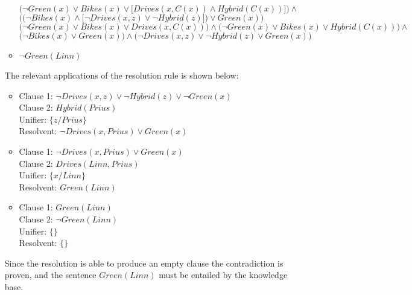 \begin{enumerate}
\begin{itemize}
$\big(\neg \textit{Green}(x) \lor \textit{Bikes}(x) \lor \big[ \textit{Drives}(x, C(x)) \land \textit{Hybrid}(C(x)) \big] \big) \land$\\
$\big(\big( \neg \textit{Bikes}(x) \land  \big[ \neg \textit{Drives}(x, z) \lor \neg \textit{Hybrid}(z) \big] \big) \lor \textit{Green}(x) \big)$\\[1ex]
$\big(\neg \textit{Green}(x) \lor \textit{Bikes}(x) \lor \textit{Drives}(x, C(x)) \big) \land \big(\neg \textit{Green}(x) \lor \textit{Bikes}(x) \lor \textit{Hybrid}(C(x)) \big) \land$\\
$\big( \neg \textit{Bikes}(x) \lor \textit{Green}(x) \big) \land \big( \neg \textit{Drives}(x, z) \lor \neg \textit{Hybrid}(z) \lor \textit{Green}(x) \big)$

\item
$\neg \textit{Green}(\textit{Linn})$

\end{itemize}

The relevant applications of the resolution rule is shown below:

\begin{itemize}
\item
Clause 1: $\neg \textit{Drives}(x, z) \lor \neg \textit{Hybrid}(z) \lor \neg \textit{Green}(x)$\\
Clause 2: $\textit{Hybrid}(\textit{Prius})$\\
Unifier: $\{z / \textit{Prius}\}$\\
Resolvent: $\neg \textit{Drives}(x, \textit{Prius}) \lor \textit{Green}(x) $

\item
Clause 1: $\neg \textit{Drives}(x, \textit{Prius}) \lor \textit{Green}(x)$\\
Clause 2: $\textit{Drives}(\textit{Linn}, \textit{Prius})$\\
Unifier: $\{ x / \textit{Linn} \}$\\
Resolvent: $\textit{Green}(\textit{Linn})$

\item
Clause 1: $\textit{Green}(\textit{Linn})$\\
Clause 2: $\neg \textit{Green}(\textit{Linn})$\\
Unifier: $\{\}$\\
Resolvent: $\{\}$
\end{itemize}

Since the resolution is able to produce an empty clause the contradiction is proven, and the sentence $\textit{Green}(\textit{Linn})$ must be entailed by the knowledge base.

\end{enumerate}



